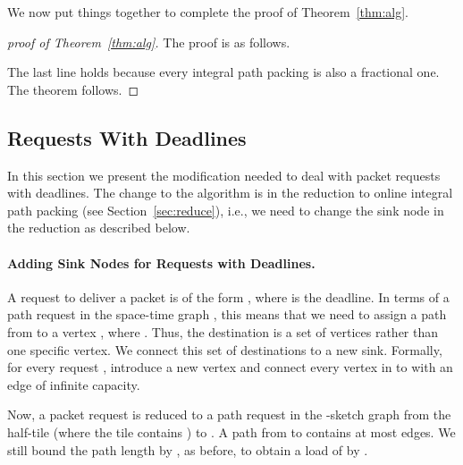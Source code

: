 \documentclass[11pt]{article}
\newenvironment{proof sketch}[1]{\noindent {\emph{Proof sketch of #1:}}}{\hfill \qed}
\begin{document}
\noindent
We now put things together to complete the proof of Theorem~\ref{thm:alg}.
\begin{proof}[proof of Theorem~\ref{thm:alg}]
The proof is as follows.
  
The last line holds because every integral path packing is also a fractional one.
The theorem follows.
\end{proof}



\subsection{Requests With Deadlines}\label{sec:d_i}
In this section we present the modification needed to deal with packet
requests with deadlines.  The change to the algorithm is in the
reduction to online integral path packing (see Section~\ref{sec:reduce}), i.e., we need to change the sink node in the reduction as described below.

\newcommand{\sink}{\textit{sink}}

\paragraph{Adding Sink Nodes for Requests with Deadlines.}
A request to deliver a packet is of the form ,
where  is the deadline.  In terms of a path request in the space-time
graph , this means that we need to assign a path from
 to a vertex , where .
Thus, the destination is a set of vertices rather than one specific
vertex.
We connect this set of destinations to a new sink. Formally, for every
request , introduce a new vertex  and connect every vertex
in  to  with an edge of infinite
capacity.

Now, a packet request  is reduced to a path
request in the -sketch graph from the half-tile
 (where the tile  contains ) to .
A path from  to  contains at most  edges. We still bound the path length by , as before, to obtain a load of  by .
\end{document}
